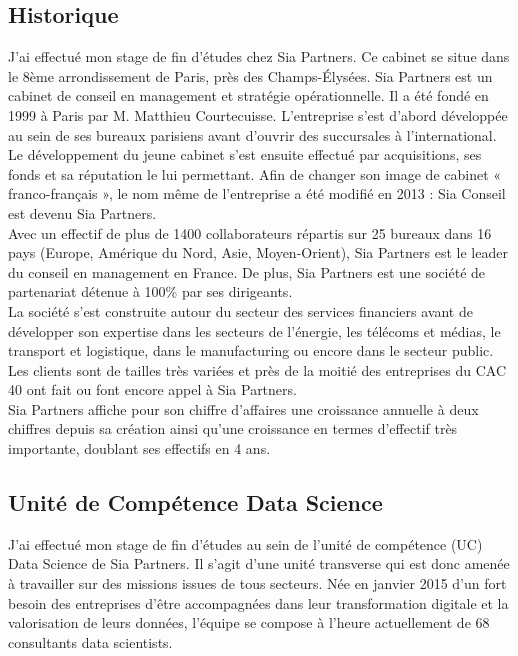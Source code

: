 \documentclass{article} %
\begin{document}
\subsection{Historique}
J’ai effectué mon stage de fin d’études chez Sia Partners. Ce cabinet se situe dans le 8ème arrondissement de Paris, près des Champs-Élysées. Sia Partners est un cabinet de conseil en management et stratégie opérationnelle. Il a été fondé en 1999 à Paris par M. Matthieu Courtecuisse. L’entreprise s’est d’abord développée au sein de ses bureaux parisiens avant d’ouvrir des succursales à l’international. Le développement du jeune cabinet s’est ensuite effectué par acquisitions, ses fonds et sa réputation le lui permettant. Afin de changer son image de cabinet « franco-français », le nom même de l’entreprise a été modifié en 2013 : Sia Conseil est devenu Sia Partners.\\

Avec un effectif de plus de 1400 collaborateurs répartis sur 25 bureaux dans 16 pays (Europe, Amérique du Nord, Asie, Moyen-Orient), Sia Partners est le leader du conseil en management en France. De plus, Sia Partners est une société de partenariat détenue à 100\% par ses dirigeants.\\

La société s’est construite autour du secteur des services financiers avant de développer son expertise dans les secteurs de l’énergie, les télécoms et médias, le transport et logistique, dans le manufacturing ou encore dans le secteur public. Les clients sont de tailles très variées et près de la moitié des entreprises du CAC 40 ont fait ou font encore appel à Sia Partners.\\

Sia Partners affiche pour son chiffre d’affaires une croissance annuelle à deux chiffres depuis sa création ainsi qu’une croissance en termes d’effectif très importante, doublant ses effectifs en 4 ans.\\

\subsection{Unité de Compétence Data Science}
J’ai effectué mon stage de fin d’études au sein de l’unité de compétence (UC) Data Science de Sia Partners. Il s’agit d’une unité transverse qui est donc amenée à travailler sur des missions issues de tous secteurs. Née en janvier 2015 d’un fort besoin des entreprises d’être accompagnées dans leur transformation digitale et la valorisation de leurs données, l’équipe se compose à l’heure actuellement de 68 consultants data scientists.\\
\end{document}
